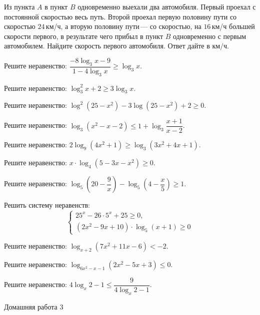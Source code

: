 \begin{class}[number=6]
	\begin{listofex}
		\item Из пункта \(A\) в пункт \(B\) одновременно выехали два автомобиля. Первый проехал с постоянной скоростью весь путь. Второй проехал первую половину пути со скоростью \(24\) км/ч, а вторую половину пути --- со скоростью, на \(16\) км/ч большей скорости первого, в результате чего прибыл в пункт \(B\) одновременно с первым автомобилем. Найдите скорость первого автомобиля. Ответ дайте в км/ч.
				\item Решите неравенство: \( \dfrac{-8\log_3 x - 9}{1-4\log_3 x}\ge\log_3 x \).
		\item Решите неравенство: \( \log^2_3x+2\ge3\log_3x \).
		\item Решите неравенство: \( \log^2(25-x^2)-3\log(25-x^2)+2\ge0 \).
		\item Решите неравенство: \( \log_3(x^2-x-2)\le1+\log_3\dfrac{x+1}{x-2} \).
		\item Решите неравенство: \( 2\log_9(4x^2+1)\ge\log_3(3x^2+4x+1) \).
		\item Решите неравенство: \( x\cdot\log_4(5-3x-x^2)\ge0 \).
		\item Решите неравенство: \( \log_5\left( 20-\dfrac{9}{x} \right)-\log_5\left( 4-\dfrac{x}{5} \right)\ge1 \).
		\item Решить систему неравенств:
		\[ \begin{cases}
			25^x-26\cdot5^x+25\ge0,\\
			(2x^2-9x+10)\cdot\log_5(x+1)\ge0
		\end{cases} \]
		\item Решите неравенство: \( \log_{x+2}(7x^2+11x-6)<-2 \).
		\item Решите неравенство: \( \log_{6x^2-x-1}(2x^2-5x+3)\le0 \).
		\item Решите неравенство: \( 4\log_x 2 - 1 \le \dfrac{9}{4\log_x 2 -1 } \).
	\end{listofex}
\end{class}

\begin{homework}[number=3]
	\begin{listofex}
		\item Домашняя работа 3
	\end{listofex}
\end{homework}

